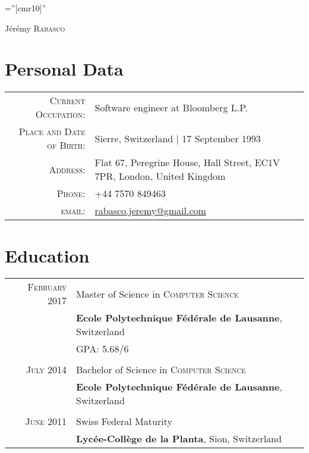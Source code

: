 \documentclass[a4paper,10pt]{article}
\begin{document}
\pagestyle{empty}
\font\fb=''[cmr10]''

\par{\centering
		{\Huge Jérémy \textsc{Rabasco}
	}\bigskip\par}

\section{Personal Data}

\begin{tabular}{rl}
	\textsc{Current Occupation:} & Software engineer at Bloomberg L.P.\\
	\textsc{Place and Date of Birth:} & Sierre, Switzerland | 17 September 1993 \\
	\textsc{Address:}   & Flat 67, Peregrine House, Hall Street, EC1V 7PR, London, United Kingdom \\
	\textsc{Phone:}     & +44 7570 849463\\
	\textsc{email:}     & \href{mailto:rabasco.jeremy@gmail.com}{rabasco.jeremy@gmail.com}
\end{tabular}

\section{Education}
\begin{tabular}{rl}	
	\textsc{February 2017} & Master of Science in \textsc{Computer Science} \\
	& \textbf{Ecole Polytechnique Fédérale de Lausanne}, Switzerland\\
	&\normalsize \textsc{GPA}: 5.68/6\\\\
	\textsc{July} 2014 & Bachelor of Science in \textsc{Computer Science}\\
	& \textbf{Ecole Polytechnique Fédérale de Lausanne}, Switzerland\\\\
	\textsc{June 2011} & Swiss Federal Maturity\\
	&\textbf{Lycée-Collège de la Planta}, Sion, Switzerland
\end{tabular}

\end{document}
